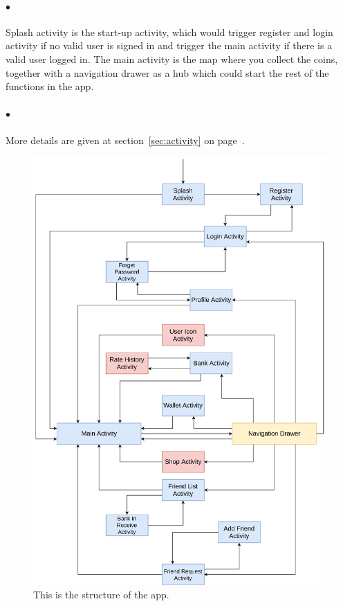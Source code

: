 \documentclass[12pt]{article}
\begin{document}
\paragraph{$\bullet$}
Splash activity is the start-up activity, which would trigger register and login activity if no valid user is signed in and trigger the main activity if there is a valid user logged in. The main activity is the map where you collect the coins, together with a navigation drawer as a hub which could start the rest of the functions in the app.
\paragraph{$\bullet$}
More details are given at section~\ref{sec:activity} on page~\pageref{sec:activity}.
\begin{figure}
	\centering
	\includegraphics[scale=0.085]{Structure.png}
	\caption{\label{fig:structure}This is the structure of the app.}
\end{figure}
\end{document}
